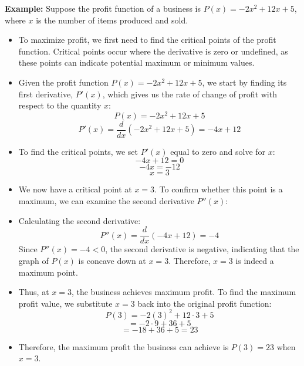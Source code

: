 \begin{enumerate}
    \textbf{Example:} Suppose the profit function of a business is \( P(x) = -2x^2 + 12x + 5 \), where \( x \) is the number of items produced and sold.
    \begin{itemize}
        \item To maximize profit, we first need to find the critical points of the profit function. Critical points occur where the derivative is zero or undefined, as these points can indicate potential maximum or minimum values.
    
        \item Given the profit function \( P(x) = -2x^2 + 12x + 5 \), we start by finding its first derivative, \( P'(x) \), which gives us the rate of change of profit with respect to the quantity \( x \):
        \[
        P(x) = -2x^2 + 12x + 5
        \]
        \[
        P'(x) = \frac{d}{dx}(-2x^2 + 12x + 5) = -4x + 12
        \]
    
        \item To find the critical points, we set \( P'(x) \) equal to zero and solve for \( x \):
        \[
        -4x + 12 = 0
        \]
        \[
        -4x = -12
        \]
        \[
        x = 3
        \]
        
        \item We now have a critical point at \( x = 3 \). To confirm whether this point is a maximum, we can examine the second derivative \( P''(x) \):
        
        \item Calculating the second derivative:
        \[
        P''(x) = \frac{d}{dx}(-4x + 12) = -4
        \]
        Since \( P''(x) = -4 < 0 \), the second derivative is negative, indicating that the graph of \( P(x) \) is concave down at \( x = 3 \). Therefore, \( x = 3 \) is indeed a maximum point.
    
        \item Thus, at \( x = 3 \), the business achieves maximum profit. To find the maximum profit value, we substitute \( x = 3 \) back into the original profit function:
        \[
        P(3) = -2(3)^2 + 12 \cdot 3 + 5
        \]
        \[
        = -2 \cdot 9 + 36 + 5
        \]
        \[
        = -18 + 36 + 5 = 23
        \]
    
        \item Therefore, the maximum profit the business can achieve is \( P(3) = 23 \) when \( x = 3 \).
    \end{itemize}
    


\end{enumerate}
